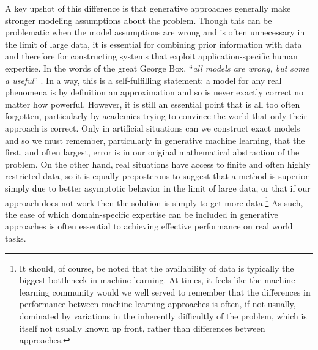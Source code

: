 A key upshot of this difference
is that generative approaches generally make stronger modeling assumptions about the problem.  Though
this can be problematic when the model assumptions are wrong and is often unnecessary in
the limit of large data, it is essential for combining prior information with data
and therefore for constructing systems that exploit application-specific human expertise.
In the words of the great George Box, ``\textit{all models are wrong, but some a useful}''
\citep{box1979robustness,box2005statistics}.  In a way, this is a self-fulfilling statement: a model for
any real phenomena
is by definition an approximation and so is never exactly correct no matter how powerful.  However,
it is still an essential point that is all too often forgotten, particularly by academics trying to convince
the world that only their approach is correct.  Only in artificial situations can we construct exact models
and so we must remember, particularly in generative machine learning, that the first, and often largest,
error is in our original mathematical abstraction of the problem.  On the other hand, real situations
have access to finite and often highly restricted data, so it is equally preposterous to suggest that a
method is superior simply due to better asymptotic behavior in the limit of large data, or that if our approach
does not work then the solution is simply to get more data.\footnote{It should, of course, be noted
	that the availability of data is typically the biggest bottleneck in machine learning.  At times, it feels 
	like the machine learning community would we well served to remember that the differences in performance between
	machine learning approaches is often, if not usually, dominated by variations in the inherently difficultly of the
	problem, which is itself not usually known up front, rather than differences between approaches.}  As such, the ease of which domain-specific
expertise can be included in generative approaches is often essential to achieving effective performance
on real world tasks.

